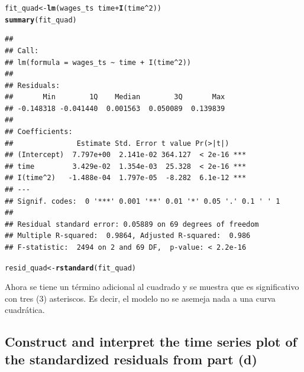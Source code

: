 \documentclass[12pt]{article}\usepackage[]{graphicx}\usepackage[]{xcolor}
\makeatletter
\newcommand{\hlnum}[1]{\textcolor[rgb]{0.686,0.059,0.569}{#1}}%
\newcommand{\hlopt}[1]{\textcolor[rgb]{0,0,0}{#1}}%
\newcommand{\hldef}[1]{\textcolor[rgb]{0.345,0.345,0.345}{#1}}%
\newcommand{\hlkwb}[1]{\textcolor[rgb]{0.69,0.353,0.396}{#1}}%
\newcommand{\hlkwd}[1]{\textcolor[rgb]{0.737,0.353,0.396}{\textbf{#1}}}%
\newenvironment{kframe}{%
 \def\at@end@of@kframe{}%
 \ifinner\ifhmode%
  \def\at@end@of@kframe{\end{minipage}}%
  \begin{minipage}{\columnwidth}%
 \fi\fi%
 \def\FrameCommand##1{\hskip\@totalleftmargin \hskip-\fboxsep
 \colorbox{shadecolor}{##1}\hskip-\fboxsep
     \hskip-\linewidth \hskip-\@totalleftmargin \hskip\columnwidth}%
 \MakeFramed {\advance\hsize-\width
   \@totalleftmargin\z@ \linewidth\hsize
   \@setminipage}}%
 {\par\unskip\endMakeFramed%
 \at@end@of@kframe}
\newenvironment{knitrout}{}{} %
\makeatother
\begin{document}
\begin{knitrout}
\color{fgcolor}\begin{kframe}
\begin{alltt}
\hldef{fit_quad} \hlkwb{<-} \hlkwd{lm}\hldef{(wages_ts} \hlopt{~} \hldef{time} \hlopt{+} \hlkwd{I}\hldef{(time}\hlopt{^}\hlnum{2}\hldef{))}
\hlkwd{summary}\hldef{(fit_quad)}
\end{alltt}
\begin{verbatim}
## 
## Call:
## lm(formula = wages_ts ~ time + I(time^2))
## 
## Residuals:
##       Min        1Q    Median        3Q       Max 
## -0.148318 -0.041440  0.001563  0.050089  0.139839 
## 
## Coefficients:
##               Estimate Std. Error t value Pr(>|t|)    
## (Intercept)  7.797e+00  2.141e-02 364.127  < 2e-16 ***
## time         3.429e-02  1.354e-03  25.328  < 2e-16 ***
## I(time^2)   -1.488e-04  1.797e-05  -8.282  6.1e-12 ***
## ---
## Signif. codes:  0 '***' 0.001 '**' 0.01 '*' 0.05 '.' 0.1 ' ' 1
## 
## Residual standard error: 0.05889 on 69 degrees of freedom
## Multiple R-squared:  0.9864,	Adjusted R-squared:  0.986 
## F-statistic:  2494 on 2 and 69 DF,  p-value: < 2.2e-16
\end{verbatim}
\begin{alltt}
\hldef{resid_quad} \hlkwb{<-} \hlkwd{rstandard}\hldef{(fit_quad)}
\end{alltt}
\end{kframe}
\end{knitrout}

Ahora se tiene un término adicional al cuadrado y se muestra que es significativo con tres (3) asteriscos. Es decir, el modelo no se asemeja nada a una curva cuadrática.

\subsection{Construct and interpret the time series plot of the standardized residuals from part (d)}
\end{document}
